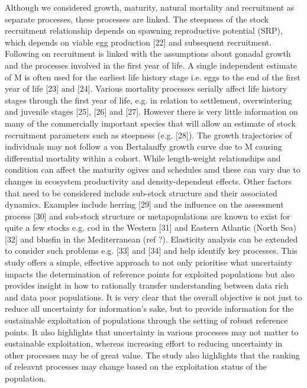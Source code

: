 \documentclass{pnastwo}
\begin{document}
\begin{article}
Although we considered growth, maturity, natural mortality and recruitment as separate processes, these processes are linked. The steepness of the stock recruitment relationship depends on spawning reproductive potential (SRP), which depends on viable egg production [22] and subsequent recruitment. Following on recruitment is linked with the assumptions about gonadal growth and the processes involved in the first year of life. A single independent estimate of M is often used for the earliest life history stage i.e. eggs to the end of the first year of life [23] and [24]. Various mortality processes serially aﬀect life history stages through the first year of life, e.g. in relation to settlement, overwintering and juvenile stages [25], [26] and [27]. However there is very little information on many of the commercially important species that will allow an estimate of stock recruitment parameters such as steepness (e.g. [28]). The growth trajectories of individuals may not follow a von Bertalanﬀy growth curve due to M causing diﬀerential mortality within a cohort. While length-weight relationships and condition can aﬀect the maturity ogives and schedules amd these can vary due to changes in ecosystem productivity and density-dependent eﬀects. Other factors that need to be considered include sub-stock structure and their associated dynamics. Examples include herring [29] and the inﬂuence on the assessment process [30] and sub-stock structure or metapopulations are known to exist for quite a few stocks e.g. cod in the Western [31] and Eastern Atlantic (North Sea) [32] and bluefin in the Mediterranean (ref ?). 
Elasticity analysis can be extended to consider such problems e.g. [33] and [34] and help identify key processes. 
This study offers a simple, effective approach to not only prioritise what uncertainty impacts the determination of reference points for exploited populations but also provides insight in how to rationally transfer understanding between data rich and data poor populations. It is very clear that the overall objective is not just to reduce all uncertainty for information’s sake, but to provide information for the sustainable exploitation of populations through the setting of robust reference points. It also highlights that uncertainty in various processes may not matter to sustainable exploitation, whereas increasing effort to reducing uncertainty in other processes may be of great value. The study also highlights that the ranking of releavnt processes may change based on the exploitation status of the population.




\end{article}
\end{document}
